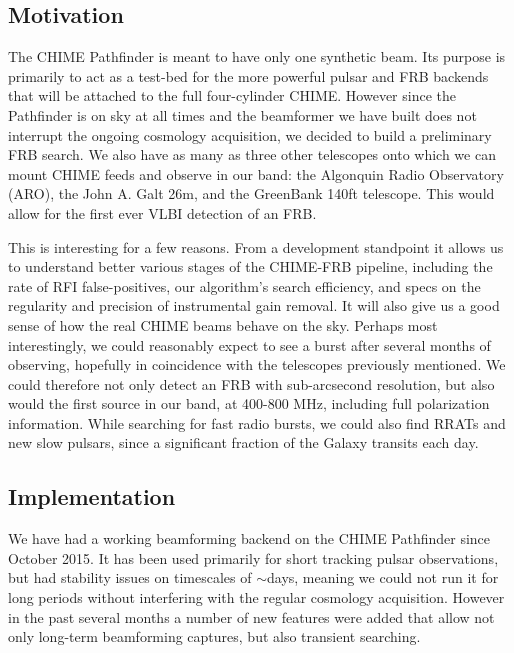 \subsection{Motivation}

The CHIME Pathfinder is meant to have only one synthetic beam. 
Its purpose is primarily to act as a test-bed for the more powerful 
pulsar and FRB backends that will be attached to the 
full four-cylinder CHIME. However since the Pathfinder is on 
sky at all times and the beamformer we have built does not 
interrupt the ongoing cosmology acquisition, we decided to 
build a preliminary FRB search. We also have as many as three 
other telescopes onto which we can mount 
CHIME feeds and observe in our band: the Algonquin Radio Observatory (ARO), 
the John A. Galt 26m, and the GreenBank 140ft telescope. This would
allow for the first ever VLBI detection of an FRB. 

This is interesting for a few reasons. From a development 
standpoint it allows us to understand better various stages of the 
CHIME-FRB pipeline, including the rate of 
RFI false-positives, our algorithm's search 
efficiency, and specs on the regularity and precision of instrumental 
gain removal. It will also give us a good sense of how the real CHIME 
beams behave on the sky. Perhaps most interestingly, 
we could reasonably expect to see a burst after several months of 
observing, hopefully in coincidence with the telescopes previously mentioned. 
We could therefore not only detect an FRB with sub-arcsecond resolution,
but also would the first source in our band, at 400-800 MHz, 
including full polarization information. While searching 
for fast radio bursts, we could also find RRATs and new slow pulsars, since 
a significant fraction of the Galaxy transits each day.

\subsection{Implementation}

We have had a working beamforming backend on the CHIME 
Pathfinder since October 2015. It has been used primarily 
for short tracking pulsar observations, but had stability issues 
on timescales of $\sim$days, meaning we could not run it 
for long periods without interfering with the regular cosmology acquisition. 
However in the past several months a number of new features 
were added that allow not only long-term beamforming captures, 
but also transient searching. 
 
